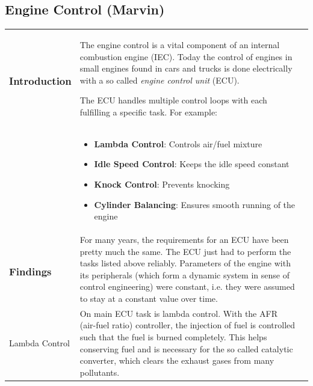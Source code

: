 \subsection{Engine Control (Marvin)}
\begin{xtabular}{|p{3.8cm}|p{8.3cm}|p{4.2cm}|}
	\vspace*{-1.25\baselineskip}
	\subsubsection{Introduction}
	&
	The engine control is a vital component of an internal combustion engine (IEC). Today the control of engines in small engines found in cars and trucks is done electrically with a so called \textit{engine control unit} (ECU).
	
	The ECU handles multiple control loops with each fulfilling a specific task. For example:
	& 
	\\
	&
	\begin{itemize}
		\item \textbf{Lambda Control}: Controls air/fuel mixture
		\item \textbf{Idle Speed Control}: Keeps the idle speed constant
		\item \textbf{Knock Control}: Prevents knocking
		\item \textbf{Cylinder Balancing}: Ensures smooth running of the engine
	\end{itemize}
	&
	\\
	\vspace*{-1.25\baselineskip}
	\subsubsection{Findings}
	&
	For many years, the requirements for an ECU have been pretty much the same. The ECU just had to perform the tasks listed above reliably. Parameters of the engine with its peripherals (which form a dynamic system in sense of control engineering) were constant, i.e. they were assumed to stay at a constant value over time. 
	&
	
	\\
	Lambda Control
	&
	On main ECU task is lambda control. With the AFR (air-fuel ratio) controller, the injection of fuel is controlled such that the fuel is burned completely. This helps conserving fuel and is necessary for the so called catalytic converter, which clears the exhaust gases from many pollutants.
	

\end{xtabular}
